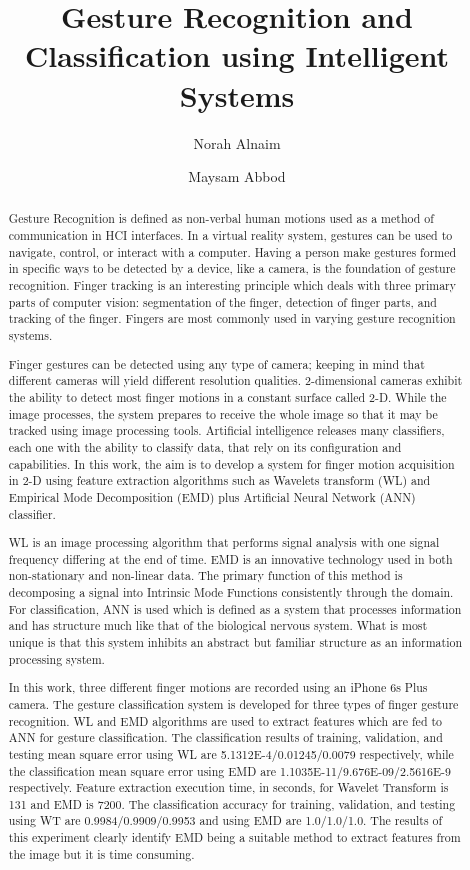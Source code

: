 \documentclass[a4paper,UKenglish]{oasics-v2016}
\title{Gesture Recognition and Classification using Intelligent Systems}
\author[1]{Norah Alnaim}
\author[2]{Maysam Abbod}
\affil[1,2]{
	Department of Electronic and Computer Engineering\\
	Brunel University London\\
	Uxbridge UB8 3PH\\
	UK
}
\affil[1]{\texttt{Norah.alnaim@brunel.ac.uk}}
\affil[2]{\texttt{Maysam.abbod@brunel.ac.uk}}
\begin{document}
\maketitle

\begin{abstract}
	Gesture Recognition is defined as non-verbal human motions used as a method of communication in HCI interfaces. In a virtual reality system, gestures can be used to navigate, control, or interact with a computer. Having a person make gestures formed in specific ways to be detected by a device, like a camera, is the foundation of gesture recognition. Finger tracking is an interesting principle which deals with three primary parts of computer vision: segmentation of the finger, detection of finger parts, and tracking of the finger. Fingers are most commonly used in varying gesture recognition systems. 
	
	Finger gestures can be detected using any type of camera; keeping in mind that different cameras will yield different resolution qualities. 2-dimensional cameras exhibit the ability to detect most finger motions in a constant surface called 2-D. While the image processes, the system prepares to receive the whole image so that it may be tracked using image processing tools. Artificial intelligence releases many classifiers, each one with the ability to classify data, that rely on its configuration and capabilities. In this work, the aim is to develop a system for finger motion acquisition in 2-D using feature extraction algorithms such as Wavelets transform (WL) and Empirical Mode Decomposition (EMD) plus Artificial Neural Network (ANN) classifier.
	
	WL is an image processing algorithm that performs signal analysis with one signal frequency differing at the end of time. EMD is an innovative technology used in both non-stationary and non-linear data. The primary function of this method is decomposing a signal into Intrinsic Mode Functions consistently through the domain. For classification, ANN is used which is defined as a system that processes information and has structure much like that of the biological nervous system. What is most unique is that this system inhibits an abstract but familiar structure as an information processing system. 
	
	In this work, three different finger motions are recorded using an iPhone 6s Plus camera. The gesture classification system is developed for three types of finger gesture recognition. WL and EMD algorithms are used to extract features which are fed to ANN for gesture classification. The classification results of training, validation, and testing mean square error using WL are 5.1312E-4/0.01245/0.0079 respectively, while the classification mean square error using EMD are 1.1035E-11/9.676E-09/2.5616E-9 respectively. Feature extraction execution time, in seconds, for Wavelet Transform is 131 and EMD is 7200. The classification accuracy for training, validation, and testing using WT are 0.9984/0.9909/0.9953 and using EMD are 1.0/1.0/1.0. The results of this experiment clearly identify EMD being a suitable method to extract features from the image but it is time consuming.
	
\end{abstract}
\end{document}
